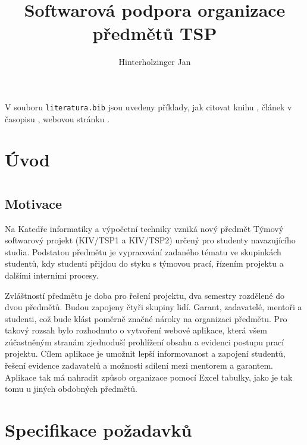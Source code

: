 \documentclass[czech,BP]{thesiskiv}
\author{Hinterholzinger Jan}
\title{Softwarová podpora organizace předmětů TSP}
\begin{document}
%
\maketitle
\tableofcontents

V souboru \texttt{literatura.bib} jsou uvedeny příklady, jak citovat knihu \cite{KnuthAOCP2}, článek v časopisu \cite{Hoare1961}, webovou stránku \cite{Graphics2D}.
\chapter{Úvod}
\chapter{}
\section{Motivace}
	\par Na Katedře informatiky a výpočetní techniky vzniká nový předmět Týmový softwarový projekt (KIV/TSP1 a KIV/TSP2) určený pro studenty navazujícího studia. Podstatou předmětu je vypracování zadaného tématu ve skupinkách studentů, kdy studenti přijdou do styku s týmovou prací, řízením projektu a dalšími interními procesy.
	\par Zvláštností předmětu je doba pro řešení projektu, dva semestry rozdělené do dvou předmětů. Budou zapojeny čtyři skupiny lidí. Garant, zadavatelé, mentoři a studenti, což bude klást poměrně značné nároky na organizaci předmětu. Pro takový rozsah bylo rozhodnuto o vytvoření webové aplikace, která všem zúčastněným stranám zjednoduší prohlížení obsahu a evidenci postupu prací projektu. Cílem aplikace je umožnit lepší informovanost a zapojení studentů, řešení evidence zadavatelů a možnosti sdílení mezi mentorem a garantem. Aplikace tak má nahradit způsob organizace pomocí Excel tabulky, jako je tak tomu u jiných obdobných předmětů.
\chapter{Specifikace požadavků}
\end{document}
